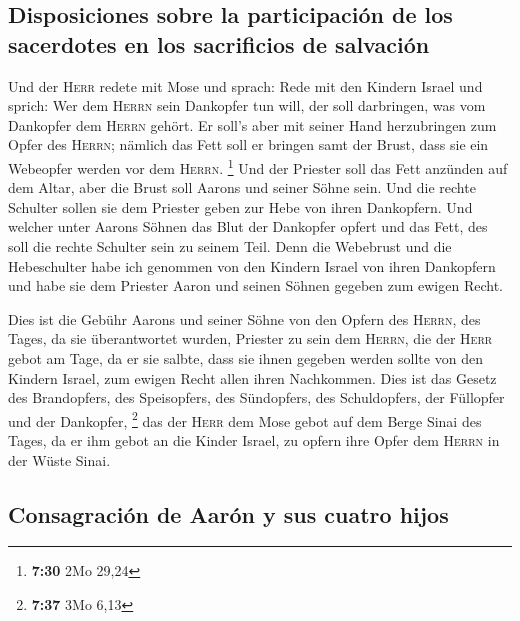 \hypertarget{disposiciones-sobre-la-participaciuxf3n-de-los-sacerdotes-en-los-sacrificios-de-salvaciuxf3n}{%
\subsection{Disposiciones sobre la participación de los sacerdotes en
los sacrificios de
salvación}\label{disposiciones-sobre-la-participaciuxf3n-de-los-sacerdotes-en-los-sacrificios-de-salvaciuxf3n}}

 Und der \textsc{Herr} redete mit Mose und sprach:
 Rede mit den Kindern Israel und sprich: Wer dem
\textsc{Herrn} sein Dankopfer tun will, der soll darbringen, was vom
Dankopfer dem \textsc{Herrn} gehört.  Er soll's aber mit
seiner Hand herzubringen zum Opfer des \textsc{Herrn}; nämlich das Fett
soll er bringen samt der Brust, dass sie ein Webeopfer werden vor dem
\textsc{Herrn}. \footnote{\textbf{7:30} 2Mo 29,24}  Und
der Priester soll das Fett anzünden auf dem Altar, aber die Brust soll
Aarons und seiner Söhne sein.  Und die rechte Schulter
sollen sie dem Priester geben zur Hebe von ihren Dankopfern.
 Und welcher unter Aarons Söhnen das Blut der Dankopfer
opfert und das Fett, des soll die rechte Schulter sein zu seinem Teil.
 Denn die Webebrust und die Hebeschulter habe ich
genommen von den Kindern Israel von ihren Dankopfern und habe sie dem
Priester Aaron und seinen Söhnen gegeben zum ewigen Recht.

 Dies ist die Gebühr Aarons und seiner Söhne von den
Opfern des \textsc{Herrn}, des Tages, da sie überantwortet wurden,
Priester zu sein dem \textsc{Herrn},  die der
\textsc{Herr} gebot am Tage, da er sie salbte, dass sie ihnen gegeben
werden sollte von den Kindern Israel, zum ewigen Recht allen ihren
Nachkommen.  Dies ist das Gesetz des Brandopfers, des
Speisopfers, des Sündopfers, des Schuldopfers, der Füllopfer und der
Dankopfer, \footnote{\textbf{7:37} 3Mo 6,13}  das der
\textsc{Herr} dem Mose gebot auf dem Berge Sinai des Tages, da er ihm
gebot an die Kinder Israel, zu opfern ihre Opfer dem \textsc{Herrn} in
der Wüste Sinai.

\hypertarget{consagraciuxf3n-de-aaruxf3n-y-sus-cuatro-hijos}{%
\subsection{Consagración de Aarón y sus cuatro
hijos}\label{consagraciuxf3n-de-aaruxf3n-y-sus-cuatro-hijos}}

